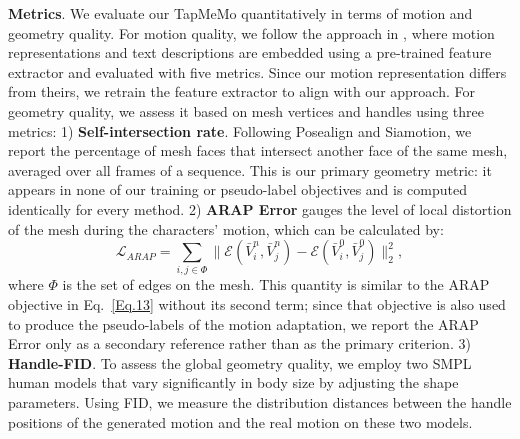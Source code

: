 \documentclass[lettersize,journal]{IEEEtran}
\newcommand{\blu}[1]{\texorpdfstring{{\leavevmode\color{blue}#1}}{#1}}
\begin{document}
\textbf{Metrics}. We evaluate our TapMeMo quantitatively in terms of motion and geometry quality. For motion quality, we follow the approach in \cite{guo2022generating}, where motion representations and text descriptions are embedded using a pre-trained feature extractor and evaluated with five metrics. Since our motion representation differs from theirs, we retrain the feature extractor to align with our approach. For geometry quality, we assess it based on mesh vertices and handles using \blu{three} metrics:
1) \textbf{\blu{Self-intersection rate}}\blu{. Following Posealign and Siamotion, we report the
percentage of mesh faces that intersect another face of the same mesh, averaged over all frames of a
sequence. This is our primary geometry metric: it appears in none of our training or pseudo-label
objectives and is computed identically for every method.
2) \textbf{ARAP Error} gauges} the level of local distortion of the mesh during the characters'
motion, which can be calculated by:
\begin{equation} \label{Eq.15}
\mathcal{L}_{ARAP} = \sum_{i,j \in \Phi} \lVert \mathcal{E}(\bar{V}^{n}_{i}, \bar{V}^{n}_{j}) - \mathcal{E}(\bar{V}^{0}_{i}, \bar{V}^{0}_{j}) \rVert^{2}_{2},
\end{equation}
where $\Phi$ is the set of edges on the mesh. \blu{This quantity} is similar to the ARAP
objective in Eq.\blu{~\ref{Eq.13} without its second term; since that objective is also used to produce
the pseudo-labels of the motion adaptation, we report the ARAP Error only as a secondary reference
rather than as the primary criterion.} 3) \textbf{Handle-FID}. To assess the global
geometry quality, we employ two SMPL human models that vary significantly in body size by adjusting the shape parameters. Using FID, we measure the distribution distances between the handle positions of the generated motion and the real motion on these two models. 
\end{document}
